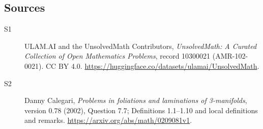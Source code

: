 \documentclass[11pt]{article}
\begin{document}
\subsection{Sources}
\begin{description}
\item[\hypertarget{source:10300021:1}{S1}] ULAM.AI and the UnsolvedMath Contributors, \emph{UnsolvedMath: A Curated Collection of Open Mathematics Problems}, record 10300021 (AMR-102-0021). CC BY 4.0. \url{https://huggingface.co/datasets/ulamai/UnsolvedMath}.
\item[\hypertarget{source:10300021:2}{S2}] Danny Calegari, \emph{Problems in foliations and laminations of 3-manifolds}, version 0.78 (2002), Question 7.7; Definitions 1.1--1.10 and local definitions and remarks. \url{https://arxiv.org/abs/math/0209081v1}.
\end{description}
\label{end:10300021}
\end{document}
